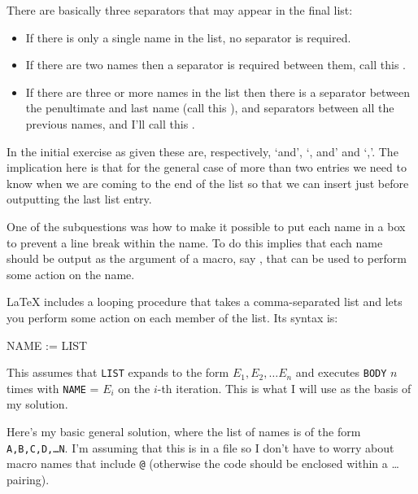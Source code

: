     There are basically three separators that may appear in the final list:
\begin{itemize}
\item If there is only a single name in the list, no separator is required.
\item If there are two names then a separator is required between them,
      call this \cmd{\pairsep}.
\item If there are three or more names in the list then there is a separator
      between the penultimate and last name (call this \cmd{\lastsep}),
      and separators between all the previous names, and I'll call this
      \cmd{\midsep}.
\end{itemize}
In the initial exercise as given these are, respectively, `and', `, and' 
and `,'. The implication here is that for the general case of more than 
two entries we need to know 
when we are coming to the end of the list so that we can insert \cmd{\lastsep}
just before outputting the last list entry.

    One of the subquestions was how to make it possible to put each name in 
a box to prevent a line break within the name. To do this implies that 
each name
should be output as the argument of a macro, say \cmd{\opname}, that can be
used to perform some action on the name.

    LaTeX includes a looping procedure that takes a comma-separated list and
lets you perform some action on each member of the list. Its syntax is:
\begin{lcode}
\@for NAME := LIST 
\end{lcode}
This assumes that \texttt{LIST} expands to the form $E_1, E_2, \ldots E_n$
and executes \texttt{BODY} $n$ times with \texttt{NAME} = $E_i$ on the $i$-th
iteration. This is what I will use as the basis of my solution.

    Here's my basic general solution, where the list of names is of the form
\texttt{A,B,C,D,\ldots N}. I'm assuming that this is in a  file
so I don't have to worry about macro names that include \texttt{@} (otherwise
the code should be enclosed within a 
\cmd{\makeatletter} \ldots \cmd{\makeatother} pairing).

